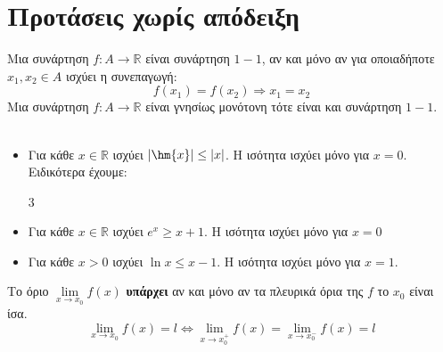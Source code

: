  \section{Προτάσεις χωρίς απόδειξη}
Μια συνάρτηση $f:A\to\mathbb{R}$ είναι συνάρτηση $1-1$, αν και μόνο αν για οποιαδήποτε $x_1,x_2\in A$ ισχύει η συνεπαγωγή:
\[f(x_1)=f(x_2)\Rightarrow x_1=x_2\]
Μια συνάρτηση $f:A\to\mathbb{R}$ είναι γνησίως μονότονη τότε είναι και συνάρτηση $1-1$.\\\\
\vspace{-5mm}
\begin{itemize}
\item Για κάθε $x\in\mathbb{R}$ ισχύει $|\hm{x}|\leq |x|$. Η ισότητα ισχύει μόνο για $x=0$. Ειδικότερα έχουμε:
\begin{multicols}{3}
\end{multicols}
\item Για κάθε $x\in\mathbb{R}$ ισχύει $e^x\geq x+1$. Η ισότητα ισχύει μόνο για $x=0$
\item Για κάθε $x>0$ ισχύει $\ln{x}\leq x-1$. Η ισότητα ισχύει μόνο για $x=1$.
\end{itemize}

Το όριο $\lim\limits_{x\to x_0}{f(x)}$ \textbf{υπάρχει} αν και μόνο αν τα πλευρικά όρια της $f$ το $x_0$ είναι ίσα.
\[ \lim\limits_{x\to x_0}{f(x)}=l\Leftrightarrow\lim_{x\rightarrow x_0^+}{f(x)}=\lim_{x\rightarrow x_0^-}{f(x)}=l \]

